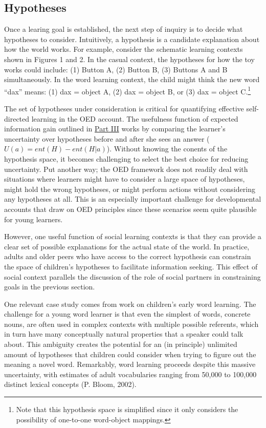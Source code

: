 \documentclass[english,floatsintext,man]{apa6}
\theoremstyle{definition}
\theoremstyle{definition}
\theoremstyle{definition}
\theoremstyle{remark}
\begin{document}
\subsection{Hypotheses}\label{hypotheses}

Once a learing goal is established, the next step of inquiry is to
decide what hypotheses to consider. Intuitively, a hypothesis is a
candidate explanation about how the world works. For example, consider
the schematic learning contexts shown in Figures 1 and 2. In the casual
context, the hypotheses for how the toy works could include: (1) Button
A, (2) Button B, (3) Buttons A and B simultaneously. In the word
learning context, the child might think the new word \enquote{dax}
means: (1) dax = object A, (2) dax = object B, or (3) dax = object
C.\footnote{Note that this hypothesis space is simplified since it only
  considers the possibility of one-to-one word-object mappings.}

The set of hypotheses under consideration is critical for quantifying
effective self-directed learning in the OED account. The usefulness
function of expected information gain outlined in
\protect\hyperlink{p3}{Part III} works by comparing the learner's
uncertainty over hypotheses before and after she sees an answer
(\(U(a) = ent(H) - ent(H|a)\)). Without knowing the conents of the
hypothesis space, it becomes challenging to select the best choice for
reducing uncertainty. Put another way; the OED framework does not
readily deal with situations where learners might have to consider a
large space of hypotheses, might hold the wrong hypotheses, or might
perform actions without considering any hypotheses at all. This is an
especially important challenge for developmental accounts that draw on
OED principles since these scenarios seem quite plausible for young
learners.

However, one useful function of social learning contexts is that they
can provide a clear set of possible explanations for the actual state of
the world. In practice, adults and older peers who have access to the
correct hypothesis can constrain the space of children's hypotheses to
facilitate information seeking. This effect of social context parallels
the discussion of the role of social partners in constraining goals in
the previous section.

One relevant case study comes from work on children's early word
learning. The challenge for a young word learner is that even the
simplest of words, concrete nouns, are often used in complex contexts
with multiple possible referents, which in turn have many conceptually
natural properties that a speaker could talk about. This ambiguity
creates the potential for an (in principle) unlimited amount of
hypotheses that children could consider when trying to figure out the
meaning a novel word. Remarkably, word learning proceeds despite this
massive uncertainty, with estimates of adult vocabularies ranging from
50,000 to 100,000 distinct lexical concepts (P. Bloom, 2002).
\end{document}
